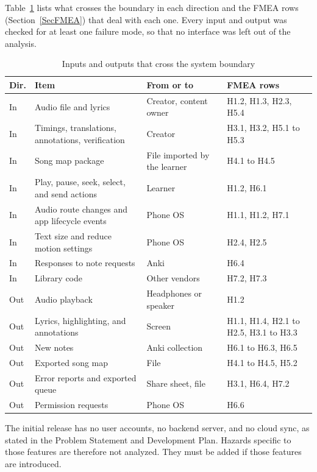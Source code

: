 \documentclass{article}
\begin{document}
Table~\ref{TblInterfaces} lists what crosses the boundary in each direction
and the FMEA rows (Section~\ref{SecFMEA}) that deal with each one. Every input
and output was checked for at least one failure mode, so that no interface was
left out of the analysis.

\begin{table}[h!]
\caption{Inputs and outputs that cross the system boundary}
\label{TblInterfaces}
\small
\begin{tabularx}{\textwidth}{l>{\raggedright\arraybackslash}Xl>{\raggedright\arraybackslash}X}
\toprule
\textbf{Dir.} & \textbf{Item} & \textbf{From or to} & \textbf{FMEA rows}\\
\midrule
In & Audio file and lyrics & Creator, content owner & H1.2, H1.3, H2.3,
H5.4\\
In & Timings, translations, annotations, verification & Creator & H3.1,
H3.2, H5.1 to H5.3\\
In & Song map package & File imported by the learner & H4.1 to H4.5\\
In & Play, pause, seek, select, and send actions & Learner & H1.2, H6.1\\
In & Audio route changes and app lifecycle events & Phone OS & H1.1, H1.2,
H7.1\\
In & Text size and reduce motion settings & Phone OS & H2.4, H2.5\\
In & Responses to note requests & Anki & H6.4\\
In & Library code & Other vendors & H7.2, H7.3\\
Out & Audio playback & Headphones or speaker & H1.2\\
Out & Lyrics, highlighting, and annotations & Screen & H1.1, H1.4, H2.1 to
H2.5, H3.1 to H3.3\\
Out & New notes & Anki collection & H6.1 to H6.3, H6.5\\
Out & Exported song map & File & H4.1 to H4.5, H5.2\\
Out & Error reports and exported queue & Share sheet, file & H3.1, H6.4,
H7.2\\
Out & Permission requests & Phone OS & H6.6\\
\bottomrule
\end{tabularx}
\end{table}

The initial release has no user accounts, no backend server, and no cloud
sync, as stated in the Problem Statement and Development Plan. Hazards specific
to those features are therefore not analyzed. They must be added if those
features are introduced.
\end{document}
